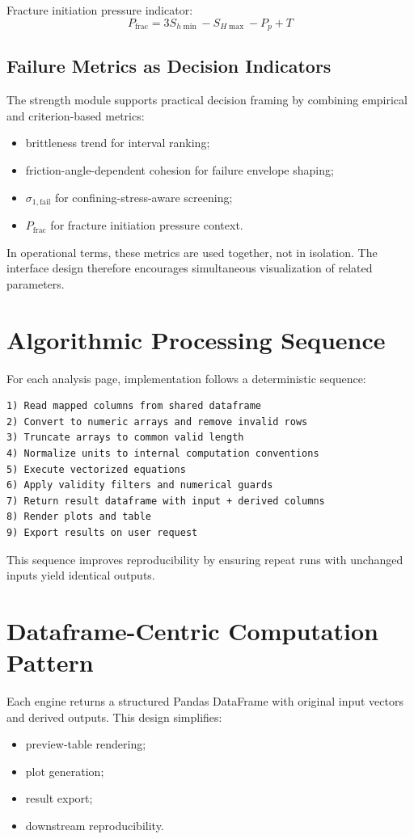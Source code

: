 \documentclass[12pt,a4paper]{report}
\begin{document}
Fracture initiation pressure indicator:
\begin{equation}
P_{\mathrm{frac}} = 3S_{h\min} - S_{H\max} - P_p + T
\end{equation}

\subsection{Failure Metrics as Decision Indicators}
The strength module supports practical decision framing by combining empirical and criterion-based metrics:
\begin{itemize}
    \item brittleness trend for interval ranking;
    \item friction-angle-dependent cohesion for failure envelope shaping;
    \item $\sigma_{1,\mathrm{fail}}$ for confining-stress-aware screening;
    \item $P_{\mathrm{frac}}$ for fracture initiation pressure context.
\end{itemize}

In operational terms, these metrics are used together, not in isolation. The interface design therefore encourages simultaneous visualization of related parameters.

\section{Algorithmic Processing Sequence}
For each analysis page, implementation follows a deterministic sequence:
\begin{lstlisting}[style=pythonstyle,caption={General computation pipeline used across analysis pages}]
1) Read mapped columns from shared dataframe
2) Convert to numeric arrays and remove invalid rows
3) Truncate arrays to common valid length
4) Normalize units to internal computation conventions
5) Execute vectorized equations
6) Apply validity filters and numerical guards
7) Return result dataframe with input + derived columns
8) Render plots and table
9) Export results on user request
\end{lstlisting}

This sequence improves reproducibility by ensuring repeat runs with unchanged inputs yield identical outputs.

\section{Dataframe-Centric Computation Pattern}
Each engine returns a structured Pandas DataFrame with original input vectors and derived outputs. This design simplifies:
\begin{itemize}
    \item preview-table rendering;
    \item plot generation;
    \item result export;
    \item downstream reproducibility.
\end{itemize}
\end{document}
